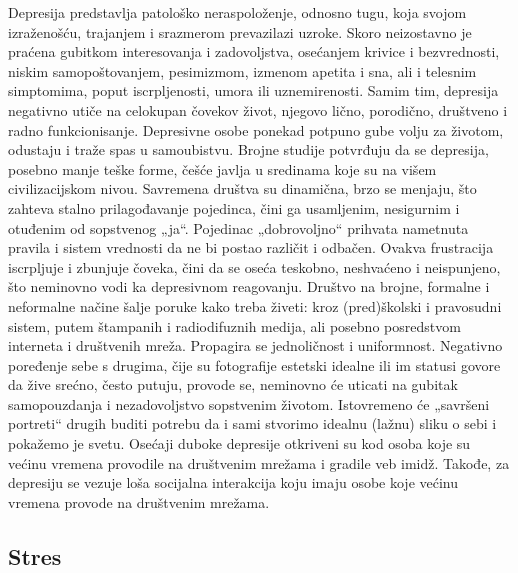 \documentclass[a4paper]{article}
\begin{document}
{		
		Depresija predstavlja patološko neraspoloženje, odnosno tugu, koja svojom izraženošću, trajanjem i srazmerom prevazilazi uzroke. Skoro neizostavno je praćena gubitkom interesovanja i zadovoljstva, osećanjem krivice i bezvrednosti, niskim samopoštovanjem, pesimizmom, izmenom apetita i sna, ali i telesnim simptomima, poput iscrpljenosti, umora ili uznemirenosti. Samim tim, depresija negativno utiče na celokupan čovekov život, njegovo lično, porodično, društveno i radno funkcionisanje. Depresivne osobe ponekad potpuno gube volju za životom, odustaju i traže spas u samoubistvu.
		Brojne studije potvrđuju da se depresija, posebno manje teške forme, češće javlja u sredinama koje su na višem civilizacijskom nivou. Savremena društva su dinamična, brzo se menjaju, što zahteva stalno prilagođavanje pojedinca, čini ga usamljenim, nesigurnim  i otuđenim od sopstvenog „ja“. Pojedinac „dobrovoljno“ prihvata nametnuta pravila i sistem vrednosti da ne bi postao različit i odbačen. Ovakva frustracija iscrpljuje i zbunjuje čoveka, čini da se oseća teskobno, neshvaćeno i neispunjeno, što neminovno vodi ka depresivnom reagovanju. Društvo na brojne, formalne i neformalne načine šalje poruke kako treba živeti: kroz (pred)školski i pravosudni sistem, putem štampanih i radiodifuznih medija, ali posebno posredstvom interneta i društvenih mreža. Propagira se jednoličnost i uniformnost. Negativno poređenje sebe s drugima, čije su fotografije estetski idealne ili im statusi govore da žive srećno, često putuju, provode se, neminovno će uticati na gubitak samopouzdanja i nezadovoljstvo sopstvenim životom. Istovremeno će „savršeni portreti“ drugih buditi potrebu da i sami stvorimo idealnu (lažnu) sliku o sebi i pokažemo je svetu. Osećaji duboke depresije otkriveni su kod osoba koje su većinu vremena provodile na društvenim mrežama i gradile veb imidž. Takođe, za depresiju se vezuje loša socijalna interakcija koju imaju osobe koje većinu vremena provode na društvenim mrežama.
		
		\subsection{Stres}
		
}
\end{document}
